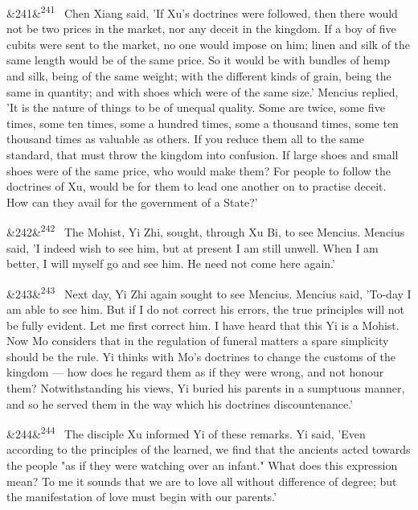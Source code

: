 \documentclass[12pt]{article}
\newcommand{\para}[1][]{\par\noindent\ifx&#1&\else\textsuperscript{\footnotesize #1}~\fi}
\begin{document}
\para[241] Chen Xiang said, 'If Xu's doctrines were followed, then there would not be two prices in the market, nor any deceit in the kingdom. If a boy of five cubits were sent to the market, no one would impose on him; linen and silk of the same length would be of the same price. So it would be with bundles of hemp and silk, being of the same weight; with the different kinds of grain, being the same in quantity; and with shoes which were of the same size.' Mencius replied, 'It is the nature of things to be of unequal quality. Some are twice, some five times, some ten times, some a hundred times, some a thousand times, some ten thousand times as valuable as others. If you reduce them all to the same standard, that must throw the kingdom into confusion. If large shoes and small shoes were of the same price, who would make them? For people to follow the doctrines of Xu, would be for them to lead one another on to practise deceit. How can they avail for the government of a State?'

\para[242] The Mohist, Yi Zhi, sought, through Xu Bi, to see Mencius. Mencius said, 'I indeed wish to see him, but at present I am still unwell. When I am better, I will myself go and see him. He need not come here again.'

\para[243] Next day, Yi Zhi again sought to see Mencius. Mencius said, 'To-day I am able to see him. But if I do not correct his errors, the true principles will not be fully evident. Let me first correct him. I have heard that this Yi is a Mohist. Now Mo considers that in the regulation of funeral matters a spare simplicity should be the rule. Yi thinks with Mo's doctrines to change the customs of the kingdom --- how does he regard them as if they were wrong, and not honour them? Notwithstanding his views, Yi buried his parents in a sumptuous manner, and so he served them in the way which his doctrines discountenance.'

\para[244] The disciple Xu informed Yi of these remarks. Yi said, 'Even according to the principles of the learned, we find that the ancients acted towards the people "as if they were watching over an infant." What does this expression mean? To me it sounds that we are to love all without difference of degree; but the manifestation of love must begin with our parents.'
\end{document}
